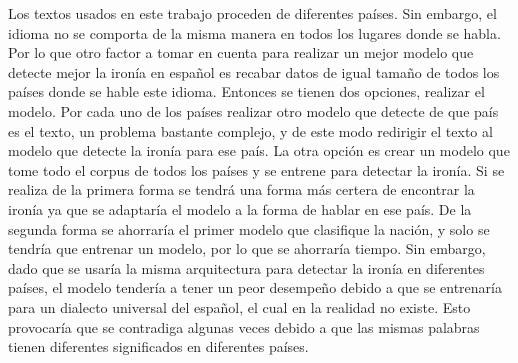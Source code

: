 \par Los textos usados en este trabajo proceden de diferentes países. Sin embargo, el idioma no se comporta de la misma manera en todos los lugares donde se habla. Por lo que otro factor a tomar en cuenta para realizar un mejor modelo que detecte mejor la ironía en español es recabar datos de igual tamaño de todos los países donde se hable este idioma. Entonces se tienen dos opciones, realizar el modelo. Por cada uno de los países realizar otro modelo que detecte de que país es el texto, un problema bastante complejo, y de este modo redirigir el texto al modelo que detecte la ironía para ese país. La otra opción es crear un modelo que tome todo el corpus de todos los países y se entrene para detectar la ironía. Si se realiza de la primera forma se tendrá una forma más certera de encontrar la ironía ya que se adaptaría el modelo a la forma de hablar en ese país. De la segunda forma se ahorraría el primer modelo que clasifique la nación, y solo se tendría que entrenar un modelo, por lo que se ahorraría tiempo. Sin embargo, dado que se usaría la misma arquitectura para detectar la ironía en diferentes países, el modelo tendería a tener un peor desempeño debido a que se entrenaría para un dialecto universal del español, el cual en la realidad no existe. Esto provocaría que se contradiga algunas veces debido a que las mismas palabras tienen diferentes significados en diferentes países.